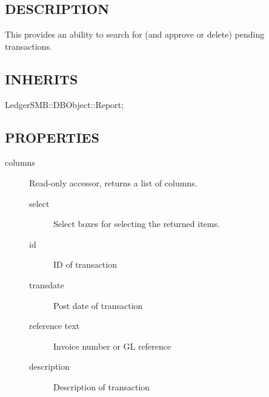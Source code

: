 \begin{description}
\begin{description}
\begin{description}
\begin{description}
\begin{description}
\begin{description}
\begin{description}
\begin{description}
\begin{description}
\begin{description}
\subsection*{DESCRIPTION\label{LedgerSMB::DBObject::Report::Unapproved::Drafts_DESCRIPTION}}


This provides an ability to search for (and approve or delete) pending
transactions.

\subsection*{INHERITS\label{LedgerSMB::DBObject::Report::Unapproved::Drafts_INHERITS}}
\begin{description}

\item[{LedgerSMB::DBObject::Report;}] \mbox{}\end{description}
\subsection*{PROPERTIES\label{LedgerSMB::DBObject::Report::Unapproved::Drafts_PROPERTIES}}
\begin{description}

\item[{columns}] \mbox{}

Read-only accessor, returns a list of columns.

\begin{description}

\item[{select}] \mbox{}

Select boxes for selecting the returned items.


\item[{id}] \mbox{}

ID of transaction


\item[{transdate}] \mbox{}

Post date of transaction


\item[{reference text}] \mbox{}

Invoice number or GL reference


\item[{description}] \mbox{}

Description of transaction



\end{description}
\end{description}
\end{description}
\end{description}
\end{description}
\end{description}
\end{description}
\end{description}
\end{description}
\end{description}
\end{description}
\end{description}
